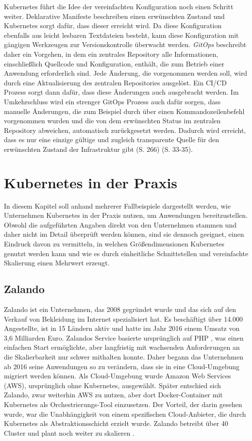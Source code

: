 \documentclass[11pt,a4paper]{article}
\begin{document}
Kubernetes führt die Idee der vereinfachten Konfiguration noch einen Schritt weiter.
Deklarative Manifeste beschreiben einen erwünschten Zustand
und Kubernetes sorgt dafür, dass dieser erreicht wird.
Da diese Konfiguration ebenfalls aus leicht lesbaren Textdateien besteht,
kann diese Konfiguration mit gängigen Werkzeugen zur Versionskontrolle
überwacht werden. \emph{GitOps} beschreibt daher ein Vorgehen,
in dem ein zentrales Repository alle Informationen, einschließlich Quellcode und Konfiguration,
enthält, die zum Betrieb einer Anwendung erforderlich sind.
Jede Änderung, die vorgenommen werden soll, wird durch eine Aktualisierung
des zentralen Repositories ausgelöst. Ein CI/CD Prozess sorgt dann dafür,
dass diese Änderungen auch ausgebracht werden.
Im Umkehrschluss wird ein strenger GitOps Prozess auch dafür sorgen,
dass manuelle Änderungen, die zum Beispiel durch über einen Kommandozeilenbefehl
vorgenommen wurden und die von dem erwünschten Status im zentralen Repository
abweichen, automatisch zurückgesetzt werden.
Dadurch wird erreicht, dass es nur eine einzige gültige und zugleich transparente
Quelle für den erwünschten Zustand der Infrastruktur gibt \cite{domingus2022cloud} (S. 266) \cite{cicd_with_kubernetes_devops} (S. 33-35).

\section{Kubernetes in der Praxis}
\label{sec:Fallbeispiele}
In diesem Kapitel soll anhand mehrerer Fallbeispiele dargestellt werden, wie Unternehmen
Kubernetes in der Praxis nutzen, um Anwendungen bereitzustellen.
Obwohl die aufgeführten Angaben direkt von den Unternehmen stammen und daher nicht im Detail
überprüft werden können, sind sie dennoch geeignet, einen Eindruck davon zu vermitteln,
in welchen Größendimensionen Kubernetes genutzt werden kann und wie es durch
einheitliche Schnittstellen und vereinfachte Skalierung
einen Mehrwert erzeugt.
\subsection{Zalando}
Zalando ist ein Unternehmen, das 2008 gegründet wurde und das sich auf den Verkauf
von Bekleidung im Internet spezialisiert hat. Es beschäftigt über 14.000 Angestellte,
ist in 15 Ländern aktiv und hatte im Jahr 2016 einem Umsatz von 3,6 Milliarden Euro.
Zalandos Service basierte ursprünglich auf PHP \cite{php}, was einen einfachen Start ermöglichte,
aber langfristig mit wachsenden Anforderungen an die Skalierbarkeit nur schwer mithalten konnte.
Daher begann das Unternehmen ab 2016 seine Anwendungen so zu verändern, dass sie
in eine Cloud-Umgebung migriert werden können. Als Cloud-Umgebung wurde Amazon Web Services (AWS),
ursprünglich ohne Kubernetes, ausgewählt. Später entschied sich Zalando,
zwar weiterhin AWS zu nutzen, aber dort Docker-Container mit Kubernetes
als Orchestrierungs-Tool einzusetzen. Der Vorteil, der darin gesehen wurde,
war die Unabhängigkeit von einem spezifischen Cloud-Anbieter, die durch
Kubernetes als Abstraktionsschicht erzielt wurde.
Zalando betreibt über 40 Cluster und plant noch weiter zu skalieren \cite{story_zalando}.
\end{document}
